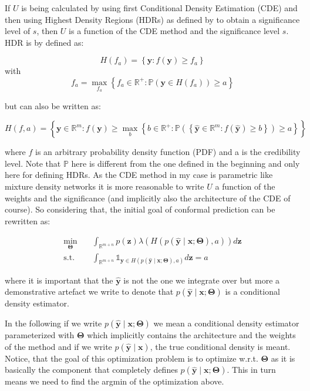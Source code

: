 \documentclass{article}
\theoremstyle{definition}
\begin{document}
If $U$ is being calculated by using first Conditional Density Estimation (CDE) and then using Highest Density Regions (HDRs) as defined by \citep{hyndman1996computing} to obtain a significance level of $s$, then $U$ is a function of the CDE method and the significance level $s$. HDR is by \citep{hyndman1996computing} defined as:

$$H\left(f_a\right)=\left\{\mathbf{y}: f(\mathbf{y}) \geq f_a\right\}$$ 
with
$$f_a = \max_{f_a} \left\{f_a \in \mathbb{R^+}: \mathbb{P}\left(\mathbf{y} \in H(f_a)\right) \geq a \right\}$$

but can also be written as:

\begin{equation}
H\left(f, a\right)=\left\{\mathbf{y} \in \mathbb{R}^m: f(\mathbf{y}) \geq \max_{b} \left\{b \in \mathbb{R^+}: \mathbb{P}\left(\left\{\mathbf{\hat{y}} \in \mathbb{R}^m: f(\mathbf{\hat{y}}) \geq b\right\}\right) \geq a \right\}\right\}
\label{eq:HDR}
\end{equation}


where $f$ is an arbitrary probability density function (PDF) and a is the credibility level. Note that $\mathbb{P}$ here is different from the one defined in the beginning and only here for defining HDRs. As the CDE method in my case is parametric like mixture density networks it is more reasonable to write $U$ a function of the weights and the significance (and implicitly also the architecture of the CDE of course). So considering that, the initial goal of conformal prediction can be rewritten as:

\begin{align}
\min_{\mathbf{\Theta}} \quad & \int_{\mathbb{R}^{m + n}} p(\mathbf{z}) \lambda(H(p(\mathbf{\hat{y}} \mid \mathbf{x}; \mathbf{\Theta}), a)) d\mathbf{z} \\
\text{s.t.} \quad & \int_{\mathbb{R}^{m + n}} \mathds{1}_{\mathbf{y} \in H(p(\mathbf{\hat{y}} \mid \mathbf{x}; \mathbf{\Theta}), a)} d\mathbf{z} = a
\end{align}

where it is important that the $\mathbf{\hat{y}}$ is not the one we integrate over but more a demonstrative artefact we write to denote that $p(\mathbf{\hat{y}} \mid \mathbf{x}; \mathbf{\Theta})$ is a conditional density estimator. 

In the following if we write $p(\mathbf{\hat{y}} \mid \mathbf{x}; \mathbf{\Theta})$ we mean a conditional density estimator parameterized with $\mathbf{\Theta}$ which implicitly contains the architecture and the weights of the method and if we write $p(\mathbf{\hat{y}} \mid \mathbf{x})$, the true conditional density is meant. Notice, that the goal of this optimization problem is to optimize w.r.t. $\mathbf{\Theta}$ as it is basically the component that completely defines $p(\mathbf{\hat{y}} \mid \mathbf{x}; \mathbf{\Theta})$. This in turn means we need to find the argmin of the optimization above.
\end{document}
